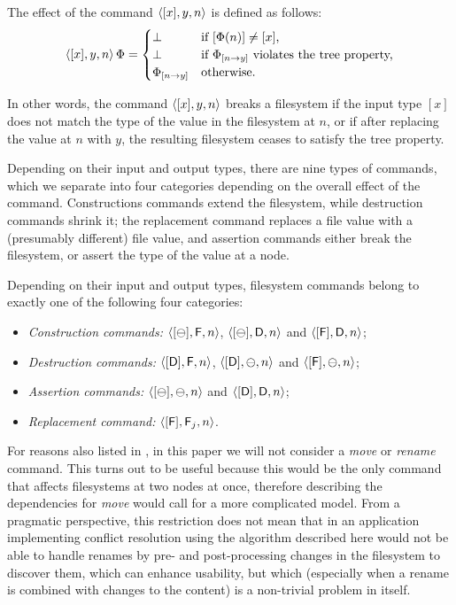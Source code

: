 \begin{mydef}
The effect of the command $\langle{[x],y,n}\rangle$ is defined as follows:
\[
\langle{[x],y,n}\rangle\,\Phi = 
   \begin{cases}
   \bot &\textrm{if $[\Phi(n)]\neq[x]$,}\\
   \bot &\textrm{if ${\Phi}_{[{n}\rightarrow{y}]}$ violates the tree property,}\\
   {\Phi}_{[{n}\rightarrow{y}]} &\textrm{otherwise.}
   \end{cases}
\]
\end{mydef}
In other words, the command $\langle{[x],y,n}\rangle$ breaks a filesystem if the input type $[x]$
does not match the type of the value in the filesystem at $n$, or if after replacing
the value at $n$ with $y$, the resulting filesystem ceases to satisfy the tree property.

\myskip
Depending on their input and output types, there are nine types of commands,
which we separate into four categories depending on the overall effect of the command.
Constructions commands extend the filesystem,
while destruction commands shrink it;
the replacement command replaces a file value with a (presumably different) file value,
and assertion commands either break the filesystem, or assert the type of the value at a node.
\begin{mydef}
Depending on their input and output types, filesystem commands
belong to exactly one of the following four categories:
\begin{itemize}
\item[]\emph{Construction commands:}
    $\langle{[\ominus],\mathsf{F},n}\rangle$, $\langle{[\ominus],\mathsf{D},n}\rangle$ and $\langle{[\mathsf{F}],\mathsf{D},n}\rangle$;
\item[]\emph{Destruction commands:}
    $\langle{[\mathsf{D}],\mathsf{F},n}\rangle$, $\langle{[\mathsf{D}],\ominus,n}\rangle$ and $\langle{[\mathsf{F}],\ominus,n}\rangle$;
\item[]\emph{Assertion commands:}
    $\langle{[\ominus],\ominus,n}\rangle$ and $\langle{[\mathsf{D}],\mathsf{D},n}\rangle$;
\item[]\emph{Replacement command:}
    $\langle{[\mathsf{F}],\mathsf{F}_j,n}\rangle$.
\qedhere
\end{itemize}
\end{mydef}



\myskip
For reasons also listed in \cite{NREC}, in this paper we will not consider
a \textit{move} or \textit{rename} command.
This turns out to be useful because this would be the only command that affects
filesystems at two nodes at once, therefore describing 
the dependencies for \textit{move} would call for a more complicated model.
From a pragmatic perspective, this restriction does not mean that in an application
implementing conflict resolution using the algorithm described here would not be
able to handle renames by pre- and post-processing changes in the filesystem to
discover them, which can enhance usability, but which
(especially when a rename is combined with changes to the content)
is a non-trivial problem in itself.

